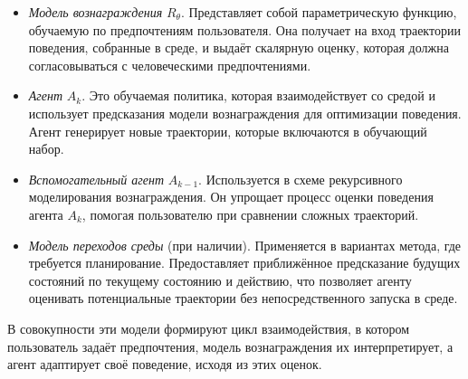 \begin{itemize}
\item \emph{Модель вознаграждения} $R_\theta$.  
Представляет собой параметрическую функцию, обучаемую по предпочтениям 
пользователя. Она получает на вход траектории поведения, собранные в 
среде, и выдаёт скалярную оценку, которая должна согласовываться с 
человеческими предпочтениями.

\item \emph{Агент} $A_k$.  
Это обучаемая политика, которая взаимодействует со средой и использует 
предсказания модели вознаграждения для оптимизации поведения. Агент 
генерирует новые траектории, которые включаются в обучающий набор.

\item \emph{Вспомогательный агент} $A_{k-1}$.  
Используется в схеме рекурсивного моделирования вознаграждения. Он 
упрощает процесс оценки поведения агента $A_k$, помогая пользователю 
при сравнении сложных траекторий.

\item \emph{Модель переходов среды} (при наличии).  
Применяется в вариантах метода, где требуется планирование. Предоставляет 
приближённое предсказание будущих состояний по текущему состоянию и 
действию, что позволяет агенту оценивать потенциальные траектории без 
непосредственного запуска в среде.
\end{itemize}

В совокупности эти модели формируют цикл взаимодействия, в котором 
пользователь задаёт предпочтения, модель вознаграждения их 
интерпретирует, а агент адаптирует своё поведение, исходя из этих 
оценок.